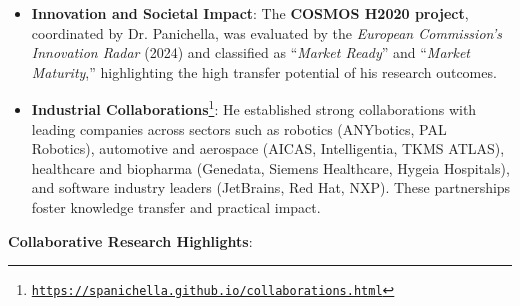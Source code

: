 \documentclass[11pt]{article}
\providecommand*\url[1]{\href{#1}{#1}}
\renewcommand*\url[1]{\href{#1}{\texttt{#1}}}
\begin{document}
\begin{itemize}
 \item 
    \textbf{Innovation and Societal Impact}: The \textbf{COSMOS H2020 project}, coordinated by Dr. Panichella, was evaluated by the \textit{European Commission's Innovation Radar} (2024) and classified as “\textit{Market Ready}” and “\textit{Market Maturity},” highlighting the high transfer potential of his research outcomes.
 \vspace{-2.5mm}
 \item 
    \textbf{Industrial Collaborations}\footnote{\url{https://spanichella.github.io/collaborations.html}}: He established strong collaborations with leading companies across sectors such as robotics (ANYbotics, PAL Robotics), automotive and aerospace (AICAS, Intelligentia, TKMS ATLAS), healthcare and biopharma (Genedata, Siemens Healthcare, Hygeia Hospitals), and software industry leaders (JetBrains, Red Hat, NXP). These partnerships foster knowledge transfer and practical impact. 
 \vspace{-2.5mm}
\end{itemize}


 \textbf{Collaborative Research Highlights}:
 
\end{document}
